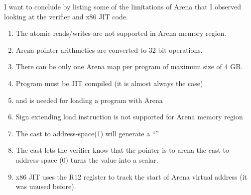 \documentclass{article} \usepackage{graphicx}
\begin{document}
I want to conclude by listing some of the limitations of Arena that I observed
looking at the verifier and x86 JIT code.

\begin{enumerate}
\item The atomic reads/writes are not supported in Arena memory region.
\item Arena pointer arithmetics are converted to 32 bit operations.
\item There can be only one Arena map per program of maximum size of 4 GB.
\item Program must be JIT compiled (it is almost always the case)
\item {} and  is needed for loading a program with Arena
\item Sign extending load instruction is not supported for Arena memory region
\item The cast to address-space(1) will generate a ``''
\item The cast lets the verifier know that the pointer is to arena
        the cast to address-space (0) turns the value into a scalar.
\item x86 JIT uses the R12 register to track the start of Arena virtual
    address (it was unused before).
\end{enumerate}



\end{document}
